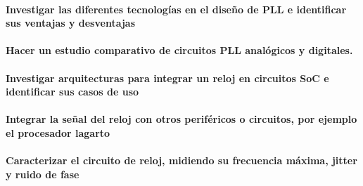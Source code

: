 \documentclass[runningheads,a4paper]{llncs}
\begin{document}
\paragraph{Investigar las diferentes tecnologías en el diseño de PLL e identificar sus ventajas y desventajas}
\paragraph{Hacer un estudio comparativo de circuitos PLL analógicos y digitales.}
\paragraph{Investigar arquitecturas para integrar un reloj en circuitos SoC e identificar sus casos de uso}
\paragraph{Integrar la señal del reloj con otros periféricos o circuitos, por ejemplo el procesador lagarto}
\paragraph{Caracterizar el circuito de reloj, midiendo su frecuencia máxima, jitter y ruido de fase}
\end{document}
